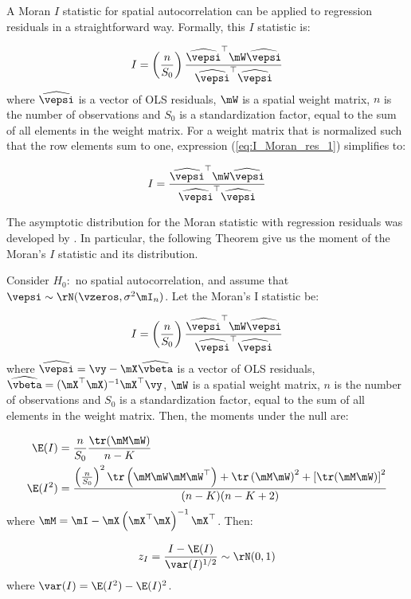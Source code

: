 \documentclass[english,12pt]{book}\usepackage[]{graphicx}\usepackage[]{xcolor}
\begin{document}
A Moran $I$ statistic for spatial autocorrelation can be applied to regression residuals in a straightforward way. Formally, this $I$ statistic is:

\begin{equation*}
I = \left(\frac{n}{S_0}\right)\frac{\widehat{\vepsi}^\top \mW\widehat{\vepsi}}{\widehat{\vepsi}^\top\widehat{\vepsi}}
\end{equation*}
%
where $\widehat{\vepsi}$ is a vector of OLS residuals, $\mW$ is a spatial weight matrix, $n$ is the number of observations and $S_0$ is a standardization factor, equal to the sum of all elements in the weight matrix. For a weight matrix that is normalized such that the row elements sum to one, expression (\ref{eq:I_Moran_res_1}) simplifies to:

\begin{equation}\label{eq:I_Moran_res_2}
I = \frac{\widehat{\vepsi}^\top \mW\widehat{\vepsi}}{\widehat{\vepsi}^\top\widehat{\vepsi}}
\end{equation}

The asymptotic distribution for the Moran statistic with regression residuals was developed by \cite{cliff1972testing, cliff1973spatial}.  In particular, the following Theorem give us the moment of the Moran's $I$ statistic and its distribution.


\begin{theorem}[Moran's $I$]\label{teo:Moran-for-residuals}
Consider $H_0:$ no spatial autocorrelation, and assume that $\vepsi \sim \rN(\vzeros, \sigma^2\mI_n)$. Let the Moran's I statistic be:

\begin{equation}\label{eq:I_Moran_res_1}
I = \left(\frac{n}{S_0}\right)\frac{\widehat{\vepsi}^\top \mW\widehat{\vepsi}}{\widehat{\vepsi}^\top\widehat{\vepsi}}
\end{equation}
where $\widehat{\vepsi} = \vy - \mX\widehat{\vbeta}$ is a vector of OLS residuals, $\widehat{\vbeta} = (\mX^\top\mX)^{-1}\mX^\top\vy$,  $\mW$ is a spatial weight matrix, $n$ is the number of observations and $S_0$ is a standardization factor, equal to the sum of all elements in the weight matrix. Then, the moments under the null are:


\begin{equation}
\begin{aligned}
  \E(I)   & = \frac{n}{S_0}\frac{\tr(\mM\mW)}{n - K} \\
  \E(I^2) & = \frac{\left(\frac{n}{S_0}\right)^2\tr\left(\mM\mW\mM\mW^\top\right) + \tr\left(\mM\mW\right)^2 + \left[\tr(\mM\mW)\right]^2}{(n -K)(n-K+2)}
\end{aligned}
\end{equation}
%
where $\mM = \mI- \mX\left(\mX^\top\mX\right)^{-1}\mX^\top$. Then:

\begin{equation}
z_I = \frac{I - \E(I)}{\var(I)^{1/2}}\sim \rN(0, 1)
\end{equation}
%
where $\var(I) = \E(I^2) - \E(I)^2$. 
\end{theorem}
\end{document}
